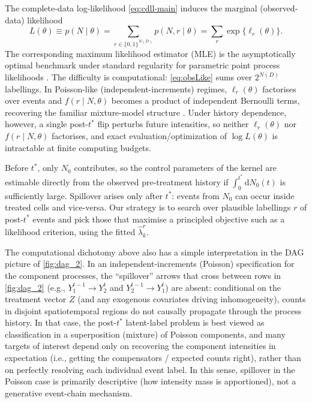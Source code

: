 \documentclass{statsoc}
\newcommand{\1}{\mathbbm{1}}
\newcommand{\Nproc}{N}
\newcommand{\Nzero}{N_0}
\begin{document}
The complete-data log-likelihood \eqref{eq:cdll-main} induces the marginal
(observed-data) likelihood
\begin{equation}\label{eq:obsLike}
L(\theta)\equiv p(\Nproc\mid \theta)
=\sum_{r\in\{0,1\}^{\Nproc(D)}} p(\Nproc,r\mid \theta)
=\sum_{r}\exp\{\ell_r(\theta)\}.
\end{equation}
The corresponding maximum likelihood estimator (MLE) is the asymptotically optimal benchmark under standard regularity for parametric point process likelihoods \citep{ogata1978asymptotic}. The difficulty is computational: \eqref{eq:obsLike} sums over \(2^{\Nproc(D)}\) labellings. In Poisson-like (independent-increments) regimes, \(\ell_r(\theta)\) factorises over events and \(f(r\mid \Nproc,\theta)\) becomes a product of independent Bernoulli terms, recovering the familiar mixture-model structure \citep{mclachlan2019finite}. Under history dependence, however, a single post-\(t^\ast\) flip perturbs future intensities, so neither \(\ell_r(\theta)\) nor \(f(r\mid \Nproc,\theta)\) factorises, and exact evaluation/optimization of \(\log L(\theta)\) is intractable at finite computing budgets.

Before \(t^\ast\), only \(\Nzero\) contributes, so the control parameters of the kernel are estimable directly from the observed pre-treatment history if \(\int_0^{t^\ast} \mathrm dN_0(t)\) is sufficiently large. Spillover arises only after \(t^\ast\): events from \(\Nzero\) can occur inside treated cells and vice-versa. Our strategy is to search over plausible labellings \(r\) of post-\(t^\ast\) events and pick those that maximise a principled objective such as a likelihood criterion, using the fitted \(\widehat\lambda_k^r\).

The computational dichotomy above also has a simple interpretation in the DAG picture of \cref{fig:dag_2}.  In an independent-increments (Poisson) specification for the component processes, the ``spillover'' arrows that cross between rows in \cref{fig:dag_2} (e.g., $Y_1^{t-1}\to Y_2^t$ and $Y_2^{t-1}\to Y_1^t$) are absent: conditional on the treatment vector $Z$ (and any exogenous covariates driving inhomogeneity), counts in disjoint spatiotemporal regions do not causally propagate through the process history.  In that case, the post-$t^\ast$ latent-label problem is best viewed as classification in a superposition (mixture) of Poisson components, and many targets of interest depend only on recovering the component intensities in expectation (i.e., getting the compensators / expected counts right), rather than on perfectly resolving each individual event label.  In this sense, spillover in the Poisson case is primarily descriptive (how intensity mass is apportioned), not a generative event-chain mechanism.
\end{document}
